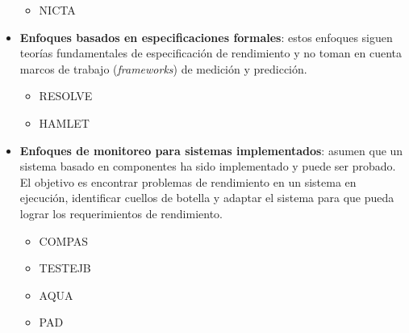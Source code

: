 \documentclass[11pt, twoside]{report}
\begin{document}
\begin{itemize}
    \begin{itemize}
        \item NICTA
    \end{itemize}
    \item \textbf{Enfoques basados en especificaciones formales}: estos enfoques siguen teorías fundamentales de especificación de rendimiento y no toman en cuenta marcos de trabajo (\emph{frameworks}) de medición y predicción.
    \begin{itemize}
        \item RESOLVE
        \item HAMLET
    \end{itemize}
    \item \textbf{Enfoques de monitoreo para sistemas implementados}: asumen que un sistema basado en componentes ha sido implementado y puede ser probado. El objetivo es encontrar problemas de rendimiento en un sistema en ejecución, identificar cuellos de botella y adaptar el sistema para que pueda lograr los requerimientos de rendimiento.
   \begin{itemize}
        \item COMPAS
        \item TESTEJB
        \item AQUA
        \item PAD
    \end{itemize}    
\end{itemize}
  
\end{document}
